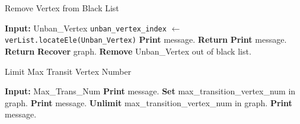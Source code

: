\begin{algorithm}
    \caption{Remove Vertex from Black List}
    \begin{algorithmic}[1]
    \State \textbf{Input:} Unban\_Vertex
    \State \quad \texttt{unban\_vertex\_index} $\gets$ \texttt{verList.locateEle(Unban\_Vertex)}
        \State \textbf{Print} message.
        \State \textbf{Return}
    \Else
            \State \textbf{Print} message.
            \State \textbf{Return}  
        \Else
            \State \textbf{Recover} graph.
            \State \textbf{Remove} Unban\_Vertex out of black list.
        \EndIf
    \EndIf
    \end{algorithmic}
\end{algorithm}

\begin{algorithm}
    \caption{Limit Max Transit Vertex Number}
    \begin{algorithmic}[1]
    \State \textbf{Input:} Max\_Trans\_Num
        \State \textbf{Print} message.
        \State \textbf{Set} max\_transition\_vertex\_num in graph.
    \Else
            \State \textbf{Print} message.
            \State \textbf{Unlimit} max\_transition\_vertex\_num in graph.
        \Else
            \State \textbf{Print} message.
        \EndIf
    \EndIf
    \end{algorithmic}
\end{algorithm}


